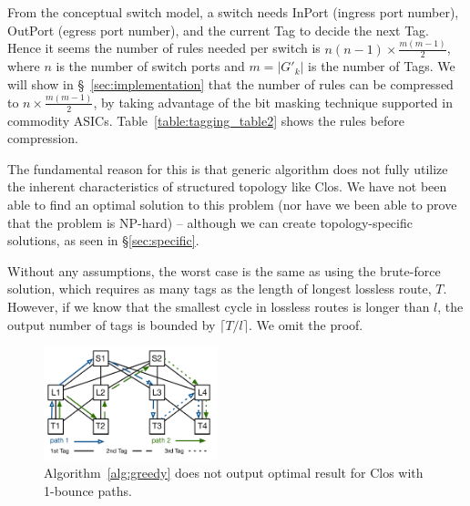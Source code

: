  From the conceptual switch model, a switch needs InPort 
(ingress port number), OutPort (egress port number), and the current Tag to decide the next Tag.
Hence it seems the number of rules needed per switch is $n(n-1)\times
\frac{m(m-1)}{2}$, where $n$ is the number of switch ports and $m=|G'_{k}|$ is
the number of Tags. We will show in \S~\ref{sec:implementation} that the number
of rules can be compressed to  $n\times \frac{m(m-1)}{2}$, by taking advantage
of the bit masking technique supported in commodity ASICs.
Table~\ref{table:tagging_table2} shows the rules before compression.



The fundamental reason for this is that generic algorithm does not fully utilize
the inherent characteristics of structured topology like Clos. We have not been
able to find an optimal solution to this problem (nor have we been able to prove
that the problem is NP-hard) -- although we can create topology-specific
solutions, as seen in \S\ref{sec:specific}. 


 Without
any assumptions, the worst case is the same as using the brute-force solution,
which requires as many tags as the length of longest lossless route, $T$.
However, if we know that the smallest cycle in lossless routes is longer than
$l$, the output number of tags is bounded by $\lceil T/l \rceil$. We omit the
proof.

\begin{figure}[t]
	\centering
	\includegraphics[width=0.45\textwidth] {figs/nonoptimal_example}
	\caption{Algorithm~\ref{alg:greedy} does not output optimal result for Clos with 1-bounce paths.}
	\label{fig:nonoptimal}
		\vspace{-0.1in}
\end{figure}